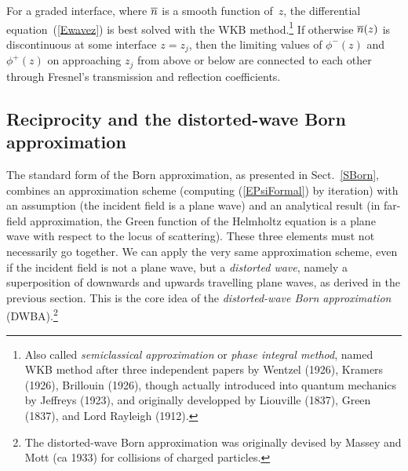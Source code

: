 For a graded interface, where $\overline{n}$ is a smooth function of~$z$,
the differential equation~(\ref{Ewavez}) is best solved
with the WKB method.\footnote
{Also called \textit{semiclassical approximation} or
\textit{phase integral method},
named WKB method after three independent papers by
Wentzel (1926), Kramers (1926), Brillouin (1926),
though actually introduced into quantum mechanics by Jeffreys (1923),
and originally developped by Liouville (1837), Green (1837),
and Lord Rayleigh (1912).}
If otherwise $\overline{n}(z)$ is discontinuous at some interface $z=z_j$,
then the limiting values of $\phi^-(z)$ and $\phi^+(z)$
on approaching $z_j$ from above or below
are connected to each other through Fresnel's
transmission and reflection coefficients.

\subsection{Reciprocity and the distorted-wave Born approximation}


The standard form of the Born approximation,
as presented in Sect.~\ref{SBorn},
combines an approximation scheme
(computing (\ref{EPsiFormal}) by iteration)
with an assumption (the incident field is a plane wave)
and an analytical result
(in far-field approximation,
the Green function of the Helmholtz equation is a plane wave
with respect to the locus of scattering).
These three elements must not necessarily go together.
We can apply the very same approximation scheme,
even if the incident field is not a plane wave,
but a \textit{distorted wave},
namely a superposition of downwards and upwards travelling plane waves,
as derived in the previous section.
This is the core idea
of the \textit{distorted-wave Born approximation} (DWBA).\footnote
{The distorted-wave Born approximation
was originally devised by Massey and Mott (ca 1933)
for collisions of charged particles.}

